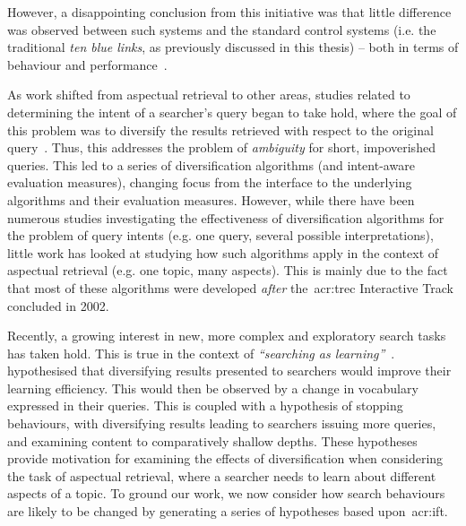 However, a disappointing conclusion from this initiative was that little difference was observed between such systems and the standard control systems (i.e. the traditional \emph{ten blue links}, as previously discussed in this thesis) -- both in terms of behaviour and performance~\citep{voorhees2005trec_book}.

As work shifted from aspectual retrieval to other areas, studies related to determining the intent of a searcher's query began to take hold, where the goal of this problem was to diversify the results retrieved with respect to the original query~\citep{rose2004understanding_user_goals}. Thus, this addresses the problem of \emph{ambiguity} for short, impoverished queries. This led to a series of diversification algorithms (and intent-aware evaluation measures), changing focus from the interface to the underlying algorithms and their evaluation measures. However, while there have been numerous studies investigating the effectiveness of diversification algorithms for the problem of query intents (e.g. one query, several possible interpretations), little work has looked at studying how such algorithms apply in the context of aspectual retrieval (e.g. one topic, many aspects). This is mainly due to the fact that most of these algorithms were developed \emph{after} the~\gls{acr:trec} Interactive Track concluded in 2002.

Recently, a growing interest in new, more complex and exploratory search tasks has taken hold. This is true in the context of \emph{``searching as learning''}~\citep{collins2017sal}.~\cite{syed2017sal} hypothesised that diversifying results presented to searchers would improve their learning efficiency. This would then be observed by a change in vocabulary expressed in their queries. This is coupled with a hypothesis of stopping behaviours, with diversifying results leading to searchers issuing more queries, and examining content to comparatively shallow depths. These hypotheses provide motivation for examining the effects of diversification when considering the task of aspectual retrieval, where a searcher needs to learn about different aspects of a topic. To ground our work, we now consider how search behaviours are likely to be changed by generating a series of hypotheses based upon~\gls{acr:ift}.

